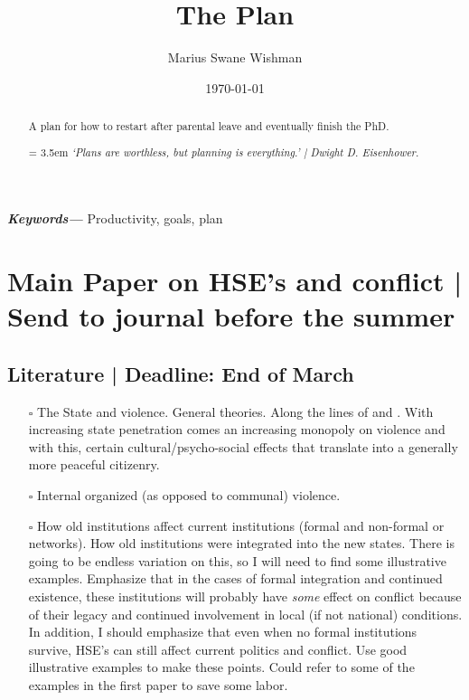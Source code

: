 \documentclass[12pt]{article}
\title{The Plan}
\author[1]{Marius Swane Wishman}
\affil[1]{Department of Sociology and Political Science, NTNU}
\date{\today}
\providecommand{\keywords}[1]
{
	\small	
	\textbf{\textit{Keywords---}} #1
}
\begin{document}
\maketitle

\begin{abstract}
	A plan for how to restart after parental leave and eventually finish the
	PhD.

\bigskip
\hangindent = 3.5em
\emph{`Plans are worthless, but planning is everything.' | 
		Dwight D. Eisenhower.
	}
\end{abstract}

\bigskip
\keywords{Productivity, goals, plan}

\pagebreak


\onehalfspacing

\section{Main Paper on HSE's and conflict | Send to journal before the summer}
\subsection{Literature | Deadline: End of March}
\begin{itemize}
	\item[$\square$] The State and violence. General theories.
		Along the lines of \citet{Pinker2012} and \citet{Tilly1990}.
		With increasing state penetration comes an increasing monopoly
		on violence \citep{Tilly1990} and with this, certain
		cultural/psycho-social effects that translate into a generally
		more peaceful citizenry.
	\item[$\square$] Internal organized (as opposed to communal) violence.

	\item[$\square$] How old institutions affect current institutions
		(formal and non-formal or networks). How old institutions were
		integrated into the new states. There is going to be endless
		variation on this, so I will need to find some illustrative
		examples. Emphasize that in the cases of formal integration and
		continued existence, these institutions will probably have
		\emph{some} effect on conflict because of their legacy and
		continued involvement in local (if not national) conditions. In
		addition, I should emphasize that even when no formal
		institutions survive, HSE's can still affect current politics
		and conflict. Use good illustrative examples to make these
		points. Could refer to some of the examples in the first paper
		to save some labor.
\end{itemize}
\end{document}
